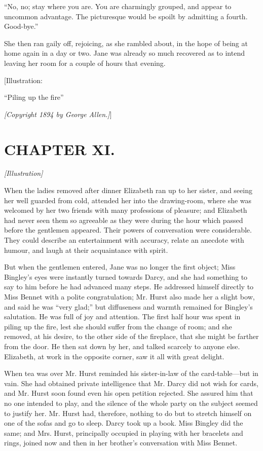\documentclass[12pt]{book}
\begin{document}
``No, no; stay where you are. You are charmingly grouped, and appear to uncommon advantage. The picturesque would be spoilt by admitting a fourth. Good-bye.''

She then ran gaily off, rejoicing, as she rambled about, in the hope of being at home again in a day or two. Jane was already so much recovered as to intend leaving her room for a couple of hours that evening.

[Illustration:

``Piling up the fire''

\emph{[\textit{Copyright 1894 by George Allen.}]}]

\chapter{CHAPTER XI.}

\emph{[Illustration]}

When the ladies removed after dinner Elizabeth ran up to her sister, and seeing her well guarded from cold, attended her into the drawing-room, where she was welcomed by her two friends with many professions of pleasure; and Elizabeth had never seen them so agreeable as they were during the hour which passed before the gentlemen appeared. Their powers of conversation were considerable. They could describe an entertainment with accuracy, relate an anecdote with humour, and laugh at their acquaintance with spirit.

But when the gentlemen entered, Jane was no longer the first object; Miss Bingley's eyes were instantly turned towards Darcy, and she had something to say to him before he had advanced many steps. He addressed himself directly to Miss Bennet with a polite congratulation; Mr. Hurst also made her a slight bow, and said he was ``very glad;'' but diffuseness and warmth remained for Bingley's salutation. He was full of joy and attention. The first half hour was spent in piling up the fire, lest she should suffer from the change of room; and she removed, at his desire, to the other side of the fireplace, that she might be farther from the door. He then sat down by her, and talked scarcely to anyone else. Elizabeth, at work in the opposite corner, saw it all with great delight.

When tea was over Mr. Hurst reminded his sister-in-law of the card-table---but in vain. She had obtained private intelligence that Mr. Darcy did not wish for cards, and Mr. Hurst soon found even his open petition rejected. She assured him that no one intended to play, and the silence of the whole party on the subject seemed to justify her. Mr. Hurst had, therefore, nothing to do but to stretch himself on one of the sofas and go to sleep. Darcy took up a book. Miss Bingley did the same; and Mrs. Hurst, principally occupied in playing with her bracelets and rings, joined now and then in her brother's conversation with Miss Bennet.
\end{document}
